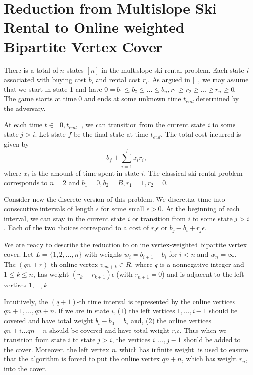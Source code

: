 \appendix

\section{Reduction from Multislope Ski Rental to Online weighted Bipartite Vertex Cover}
\label{sec:multislope}
There is a total of $n$ states $[n]$ in the multislope ski rental problem. Each state $i$ associated with buying cost $b_i$ and rental cost $r_i$. As argued in [.], we may assume that we start in state 1 and have $0=b_1\leq b_2\leq \ldots\leq b_n, r_1\geq r_2\geq \ldots\geq r_n\geq 0$. The game starts at time 0 and ends at some unknown time $t_{end}$ determined by the adversary.

At each time $t\in [0,t_{end}]$, we can transition from the current state $i$ to some state $j>i$. Let state $f$ be the final state at time $t_{end}$. The total cost incurred is given by $$b_f+\sum_{i=1}^f x_i r_i,$$where $x_i$ is the amount of time spent in state $i$. The classical ski rental problem corresponds to $n=2$ and $b_1=0,b_2=B,r_1=1,r_2=0$.

Consider now the discrete version of this problem. We discretize time into consecutive intervals of length $\epsilon$ for some small $\epsilon >0$. At the beginning of each interval, we can stay in the current state $i$ or transition from $i$ to some state $j>i$. Each of the two choices correspond to a cost of $r_i\epsilon$ or $b_j-b_i+r_j\epsilon$.


We are ready to describe the reduction to online vertex-weighted bipartite vertex cover. Let $L=\{1,2,\ldots,n\}$ with weights $w_i=b_{i+1}-b_i$ for $i<n$ and $w_n=\infty$. The $(qn+r)$-th online vertex $v_{qn+k}\in R$, where $q$ is a nonnegative integer and $1\leq k\leq n$, has weight $(r_{k}-r_{k+1})\epsilon$ (with $r_{n+1}=0$) and is adjacent to the left vertices $1,\ldots,k$.

Intuitively, the $(q+1)$-th time interval is represented by the online vertices $qn+1,\ldots,qn+n$. If we are in state $i$, (1) the left vertices $1,\ldots,i-1$ should be covered and have total weight $b_i-b_0=b_i$ and, (2) the online vertices $qn+i\ldots qn+n$ should be covered and have total weight $r_i\epsilon$. Thus when we transition from state $i$ to state $j>i$, the vertices $i,\ldots,j-1$ should be added to the cover. Moreover, the left vertex $n$, which has infinite weight, is used to ensure that the algorithm is forced to put the online vertex $qn+n$, which has weight $r_n$, into the cover.


